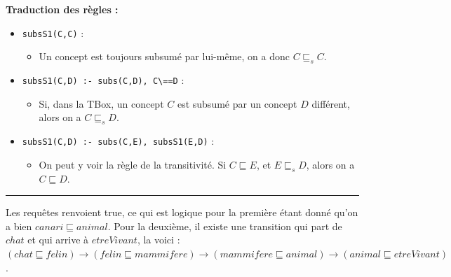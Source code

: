 \documentclass[a4paper,12pt]{report}
\begin{document}
\begin{tcolorbox}[colback=gray!10, colframe=blue!30, coltitle=black, title=Réponse à la question 2.1 - 1/1]

    \textbf{Traduction des règles :}\\[-0.4cm]
    \begin{itemize}
        \item \texttt{subsS1(C,C)} : 
        \begin{itemize}
            \item Un concept est toujours subsumé par lui-même, on a donc \(C \sqsubseteq_s C\).
        \end{itemize}
        \vspace{0.3cm}

        \item \texttt{subsS1(C,D) :- subs(C,D), C\textbackslash==D} : 
        \begin{itemize}
            \item Si, dans la TBox, un concept \(C\) est subsumé par un concept \(D\) différent, alors on a \(C \sqsubseteq_s D\).
        \end{itemize}
        \vspace{0.3cm}

        \item \texttt{subsS1(C,D) :- subs(C,E), subsS1(E,D)} : 
        \begin{itemize}
            \item On peut y voir la règle de la transitivité. Si \(C \sqsubseteq E\), et \(E \sqsubseteq_s D\), alors on a \(C \sqsubseteq D\).
        \end{itemize}
    \end{itemize}

    \vspace{0.5cm}
    \hrule
    \vspace{0.5cm}

    Les requêtes renvoient true, ce qui est logique pour la première étant donné qu'on a bien \(canari \sqsubseteq animal\). Pour la deuxième, il existe une transition
        qui part de \(chat\) et qui arrive à \(etreVivant\), la voici : \((chat \sqsubseteq felin) \rightarrow (felin \sqsubseteq mammifere) \rightarrow (mammifere \sqsubseteq animal) 
        \rightarrow (animal \sqsubseteq etreVivant)\).  

\end{tcolorbox}



\end{document}
